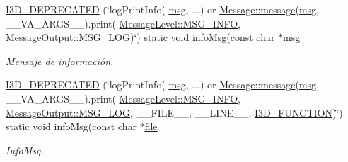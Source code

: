 \begin{DoxyCompactItemize}
\hyperlink{class_i3_d_1_1_log_msg_aeda06127fe9f852a443b55d493132fb1}{I3\+D\+\_\+\+D\+E\+P\+R\+E\+C\+A\+T\+ED} (\char`\"{}log\+Print\+Info( \hyperlink{class_i3_d_1_1_log_msg_a5a1ceb27d9529de8eb9b3fc9377e178a}{msg}, ...) or \hyperlink{class_i3_d_1_1_message_a525f877a41a1e7493188b2b720d1d254}{Message\+::message}(\hyperlink{class_i3_d_1_1_log_msg_a5a1ceb27d9529de8eb9b3fc9377e178a}{msg}, \+\_\+\+\_\+\+V\+A\+\_\+\+A\+R\+G\+S\+\_\+\+\_\+).print( \hyperlink{namespace_i3_d_a1c1740d2076e09b1a37b82e45a0327b5ad5150815f57a5219a42da2f42f90861e}{Message\+Level\+::\+M\+S\+G\+\_\+\+I\+N\+FO}, \hyperlink{namespace_i3_d_a2ccb65ac6e08844c1175a235107fa103a8c1a4761ebfadb227927517230ff7b02}{Message\+Output\+::\+M\+S\+G\+\_\+\+L\+OG})\char`\"{}) static void info\+Msg(const char $\ast$\hyperlink{class_i3_d_1_1_log_msg_a5a1ceb27d9529de8eb9b3fc9377e178a}{msg}
\begin{DoxyCompactList}\small\item\em Mensaje de información. \end{DoxyCompactList}\item 
\hyperlink{class_i3_d_1_1_log_msg_a3210f5f7a24f6a954eafd82bcad65464}{I3\+D\+\_\+\+D\+E\+P\+R\+E\+C\+A\+T\+ED} (\char`\"{}log\+Print\+Info( \hyperlink{class_i3_d_1_1_log_msg_a5a1ceb27d9529de8eb9b3fc9377e178a}{msg}, ...) or \hyperlink{class_i3_d_1_1_message_a525f877a41a1e7493188b2b720d1d254}{Message\+::message}(\hyperlink{class_i3_d_1_1_log_msg_a5a1ceb27d9529de8eb9b3fc9377e178a}{msg}, \+\_\+\+\_\+\+V\+A\+\_\+\+A\+R\+G\+S\+\_\+\+\_\+).print( \hyperlink{namespace_i3_d_a1c1740d2076e09b1a37b82e45a0327b5ad5150815f57a5219a42da2f42f90861e}{Message\+Level\+::\+M\+S\+G\+\_\+\+I\+N\+FO}, \hyperlink{namespace_i3_d_a2ccb65ac6e08844c1175a235107fa103a8c1a4761ebfadb227927517230ff7b02}{Message\+Output\+::\+M\+S\+G\+\_\+\+L\+OG}, \+\_\+\+\_\+\+F\+I\+L\+E\+\_\+\+\_\+, \+\_\+\+\_\+\+L\+I\+N\+E\+\_\+\+\_\+, \hyperlink{defs_8h_acd64dca6972802e8d77a78d3efcca04a}{I3\+D\+\_\+\+F\+U\+N\+C\+T\+I\+ON})\char`\"{}) static void info\+Msg(const char $\ast$\hyperlink{class_i3_d_1_1_log_msg_ab59f20d39ef112d2196371ae0636d77c}{file}
\begin{DoxyCompactList}\small\item\em Info\+Msg. \end{DoxyCompactList}\item 

\end{DoxyCompactItemize}
